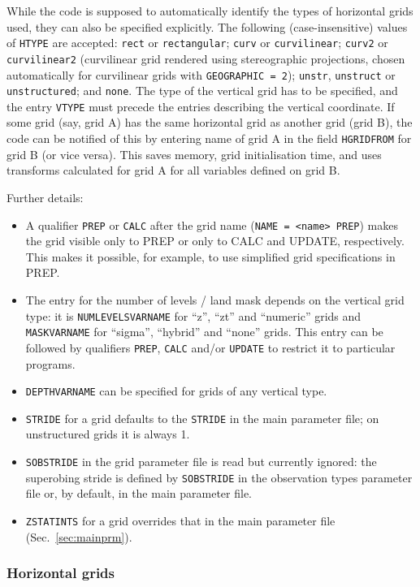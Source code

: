 \documentclass[11pt]{report}
\begin{document}
While the code is supposed to automatically identify the types of horizontal grids used, they can also be specified explicitly.
The following (case-insensitive) values of \verb|HTYPE| are accepted: \verb|rect| or \verb|rectangular|; \verb|curv| or \verb|curvilinear|; \verb|curv2| or \verb|curvilinear2| (curvilinear grid rendered using stereographic projections, chosen automatically for curvilinear grids with \verb|GEOGRAPHIC = 2|); \verb|unstr|, \verb|unstruct| or \verb|unstructured|; and \verb|none|.
The type of the vertical grid has to be specified, and the entry \verb|VTYPE| must precede the entries describing the vertical coordinate.
If some grid (say, grid A) has the same horizontal grid as another grid (grid B), the code can be notified of this by entering name of grid A in the field \verb|HGRIDFROM| for grid B (or vice versa).
This saves memory, grid initialisation time, and uses transforms calculated for grid A for all variables defined on grid B.

Further details:
\begin{itemize}
\item A qualifier \verb|PREP| or \verb|CALC| after the grid name (\verb|NAME = <name> PREP|) makes the grid visible only to PREP or only to CALC and UPDATE, respectively. This makes it possible, for example, to use simplified grid specifications in PREP.
\item The entry for the number of levels / land mask depends on the vertical grid type: it is \verb|NUMLEVELSVARNAME| for ``z'', ``zt'' and ``numeric'' grids and \verb|MASKVARNAME| for ``sigma'', ``hybrid'' and ``none'' grids. This entry can be followed by qualifiers \verb|PREP|, \verb|CALC| and/or \verb|UPDATE| to restrict it to particular programs.
\item \verb|DEPTHVARNAME| can be specified for grids of any vertical type.
\item \verb|STRIDE| for a grid defaults to the \verb|STRIDE| in the main parameter file; on unstructured grids it is always 1.
\item \verb|SOBSTRIDE| in the grid parameter file is read but currently ignored: the superobing stride is defined by \verb|SOBSTRIDE| in the observation types parameter file or, by default, in the main parameter file.
\item \verb|ZSTATINTS| for a grid overrides that in the main parameter file (Sec.~\ref{sec:mainprm}).
\end{itemize}

\subsubsection{Horizontal grids}
\label{sec:hgrid}
\end{document}
